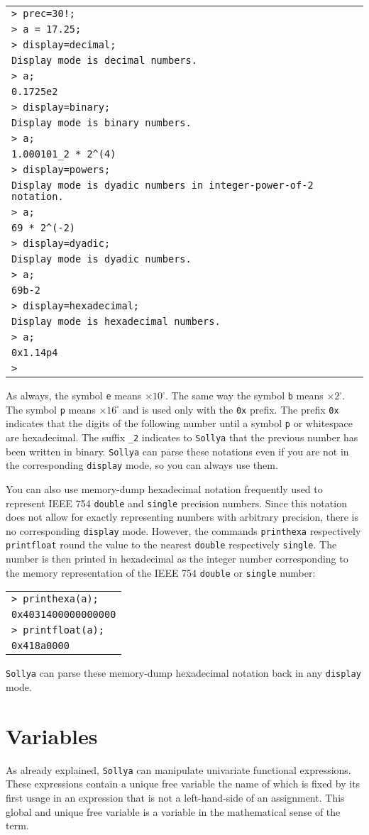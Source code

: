 \documentclass[a4paper]{article}
\newcommand{\com}[1]{\texttt{#1}}
\newcommand{\key}[1]{\texttt{#1}}
\newcommand{\sollya}{\texttt{Sollya}\xspace}
\newcommand{\code}[1]{
\begin{center}
\begin{tabular}{|p{14.8cm}|}
\hline
#1
\hline
\end{tabular}
\end{center}
}
\newcommand{\ligne}[1]{\texttt{#1}\\}
\begin{document}
\code{
\ligne{> prec=30!;}
\ligne{> a = 17.25;}
\ligne{> display=decimal;}
\ligne{Display mode is decimal numbers.}
\ligne{> a;}
\ligne{0.1725e2}
\ligne{> display=binary;}
\ligne{Display mode is binary numbers.}
\ligne{> a;}
\ligne{1.000101\_2 * 2\^{}(4)}
\ligne{> display=powers;}
\ligne{Display mode is dyadic numbers in integer-power-of-2 notation.}
\ligne{> a;}
\ligne{69 * 2\^{}(-2)}
\ligne{> display=dyadic;}
\ligne{Display mode is dyadic numbers.}
\ligne{> a;}
\ligne{69b-2}
\ligne{> display=hexadecimal;}
\ligne{Display mode is hexadecimal numbers.}
\ligne{> a;}
\ligne{0x1.14p4}
\ligne{> }
}

As always, the symbol \texttt{e} means $\times 10^\square $. The same way the symbol \texttt{b} means  $\times 2^\square $. The symbol \texttt{p} means $\times 16^\square$ and is used only with the \texttt{0x} prefix. The prefix \texttt{0x} indicates that the digits of the following number until 
a symbol \texttt{p} or whitespace are hexadecimal. The suffix \texttt{\_2} indicates to \sollya that the previous number has been written in binary. \sollya can parse these notations even if you are not in the corresponding \key{display} mode, so you can always use them.

You can also use memory-dump hexadecimal notation frequently used to represent IEEE 754 \texttt{double} and \texttt{single} precision numbers. Since this notation does not allow for exactly representing numbers with arbitrary precision, there is no corresponding \key{display} mode. However, the commands \com{printhexa} respectively \com{printfloat} round the value to the nearest \texttt{double} respectively \texttt{single}. The number is then printed in hexadecimal as the integer number corresponding to the memory representation of the IEEE 754 \texttt{double} or \texttt{single} number:

\code{
\ligne{> printhexa(a);}
\ligne{0x4031400000000000}
\ligne{> printfloat(a);}
\ligne{0x418a0000}
}

\sollya can parse these memory-dump hexadecimal notation back in any \key{display} mode.

\section{Variables}\label{variables}

As already explained, \sollya can manipulate univariate functional
expressions. These expressions contain a unique free variable the name
of which is fixed by its first usage in an expression that is not a
left-hand-side of an assignment. This global and unique free variable is 
a variable in the mathematical sense of the term. 
\end{document}
